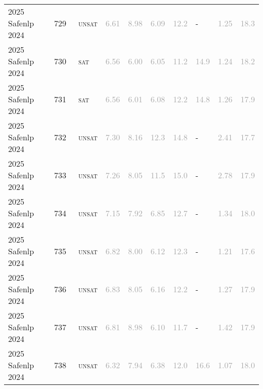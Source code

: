 \begin{center}
{\begin{longtable}{@{}llllllllll@{}}
2025 Safenlp 2024 & 729 & ~\textsc{unsat} & \textcolor{darkgray}{6.61} & \textcolor{darkgray}{8.98} & \textcolor{darkgray}{6.09} & \textcolor{darkgray}{12.2} & - & \textcolor{darkgray}{1.25} & \textcolor{darkgray}{18.3} \\
2025 Safenlp 2024 & 730 & ~\textsc{sat} & \textcolor{darkgray}{6.56} & \textcolor{darkgray}{6.00} & \textcolor{darkgray}{6.05} & \textcolor{darkgray}{11.2} & \textcolor{darkgray}{14.9} & \textcolor{darkgray}{1.24} & \textcolor{darkgray}{18.2} \\
2025 Safenlp 2024 & 731 & ~\textsc{sat} & \textcolor{darkgray}{6.56} & \textcolor{darkgray}{6.01} & \textcolor{darkgray}{6.08} & \textcolor{darkgray}{12.2} & \textcolor{darkgray}{14.8} & \textcolor{darkgray}{1.26} & \textcolor{darkgray}{17.9} \\
2025 Safenlp 2024 & 732 & ~\textsc{unsat} & \textcolor{darkgray}{7.30} & \textcolor{darkgray}{8.16} & \textcolor{darkgray}{12.3} & \textcolor{darkgray}{14.8} & - & \textcolor{darkgray}{2.41} & \textcolor{darkgray}{17.7} \\
2025 Safenlp 2024 & 733 & ~\textsc{unsat} & \textcolor{darkgray}{7.26} & \textcolor{darkgray}{8.05} & \textcolor{darkgray}{11.5} & \textcolor{darkgray}{15.0} & - & \textcolor{darkgray}{2.78} & \textcolor{darkgray}{17.9} \\
2025 Safenlp 2024 & 734 & ~\textsc{unsat} & \textcolor{darkgray}{7.15} & \textcolor{darkgray}{7.92} & \textcolor{darkgray}{6.85} & \textcolor{darkgray}{12.7} & - & \textcolor{darkgray}{1.34} & \textcolor{darkgray}{18.0} \\
2025 Safenlp 2024 & 735 & ~\textsc{unsat} & \textcolor{darkgray}{6.82} & \textcolor{darkgray}{8.00} & \textcolor{darkgray}{6.12} & \textcolor{darkgray}{12.3} & - & \textcolor{darkgray}{1.21} & \textcolor{darkgray}{17.6} \\
2025 Safenlp 2024 & 736 & ~\textsc{unsat} & \textcolor{darkgray}{6.83} & \textcolor{darkgray}{8.05} & \textcolor{darkgray}{6.16} & \textcolor{darkgray}{12.2} & - & \textcolor{darkgray}{1.27} & \textcolor{darkgray}{17.9} \\
2025 Safenlp 2024 & 737 & ~\textsc{unsat} & \textcolor{darkgray}{6.81} & \textcolor{darkgray}{8.98} & \textcolor{darkgray}{6.10} & \textcolor{darkgray}{11.7} & - & \textcolor{darkgray}{1.42} & \textcolor{darkgray}{17.9} \\
2025 Safenlp 2024 & 738 & ~\textsc{unsat} & \textcolor{darkgray}{6.32} & \textcolor{darkgray}{7.94} & \textcolor{darkgray}{6.38} & \textcolor{darkgray}{12.0} & \textcolor{darkgray}{16.6} & \textcolor{darkgray}{1.07} & \textcolor{darkgray}{18.0} \\

\end{longtable}}
\end{center}
